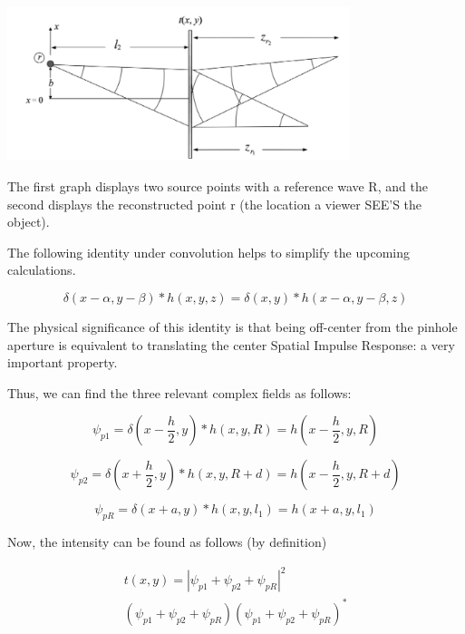 \documentclass[12pt]{article}
\begin{document}
\begin{center}
\includegraphics[width=100mm]{tupac12.png}
\end{center}

The first graph displays two source points with a reference wave R, and the second displays the reconstructed point r (the location a viewer SEE'S the object).

The following identity under convolution helps to simplify the upcoming calculations.

\begin{equation}
	\delta(x - \alpha,y - \beta)*h(x,y,z) = \delta(x,y)*h(x - \alpha,y - \beta,z)
\end{equation}

The physical significance of this identity is that being off-center from the pinhole
aperture is equivalent to translating the center Spatial Impulse Response: a very important property.

Thus, we can find the three relevant complex fields as follows:

\begin{equation}
	\psi_{p1} = \delta(x - \frac{h}{2},y)*h(x,y,R) = h(x - \frac{h}{2},y,R)
\end{equation}

\begin{equation}
	\psi_{p2} = \delta(x + \frac{h}{2},y)*h(x,y,R + d) = 
	h(x - \frac{h}{2},y,R + d)
\end{equation}

\begin{equation}
	\psi_{pR} = \delta(x + a,y)*h(x,y,l_{1}) = h(x + a,y,l_{1})
\end{equation}

Now, the intensity can be found as follows (by definition)

\begin{equation}
	\begin{multlined}
	t(x,y) = |\psi_{p1} + \psi_{p2} + \psi_{pR}|^2
	\\ (\psi_{p1} + \psi_{p2} + \psi_{pR})(\psi_{p1} + \psi_{p2} + \psi_{pR})^*
	\end{multlined}
\end{equation}
\end{document}
